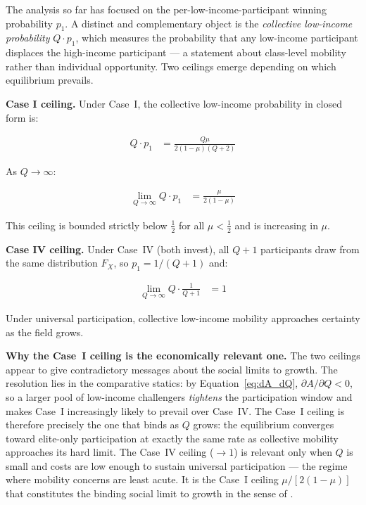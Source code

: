 \documentclass[
    oneside,
    fontsize=10pt,leqno]{article}
\begin{document}
The analysis so far has focused on the per-low-income-participant winning
probability $p_{1}$. A distinct and complementary object is the
\emph{collective low-income probability} $Q\cdot p_{1}$, which measures
the probability that any low-income participant displaces the high-income participant --- a
statement about class-level mobility rather than individual opportunity.
Two ceilings emerge depending on which equilibrium prevails.

\medskip
\noindent\textbf{Case I ceiling.} Under Case~I, the collective low-income
probability in closed form is:

\begin{align}
Q\cdot p_{1} & =\frac{Q\mu}{2(1-\mu)(Q+2)}\label{eq:collective}
\end{align}

As $Q\to\infty$:

\begin{align}
\lim_{Q\to\infty}Q\cdot p_{1} & =\frac{\mu}{2(1-\mu)}\label{eq:ceiling}
\end{align}

This ceiling is bounded strictly below $\tfrac{1}{2}$ for all
$\mu<\tfrac{1}{2}$ and is increasing in $\mu$.

\medskip
\noindent\textbf{Case IV ceiling.} Under Case~IV (both invest),
all $Q+1$ participants draw from the same distribution $F_{X}$, so
$p_{1}=1/(Q+1)$ and:

\begin{align}
\lim_{Q\to\infty}Q\cdot\frac{1}{Q+1} & =1\label{eq:ceiling_IV}
\end{align}

Under universal participation, collective low-income mobility approaches
certainty as the field grows.

\medskip
\noindent\textbf{Why the Case~I ceiling is the economically relevant
one.} The two ceilings appear to give contradictory messages about
the social limits to growth. The resolution lies in the comparative
statics: by Equation~\ref{eq:dA_dQ}, $\partial A/\partial Q<0$, so
a larger pool of low-income challengers \emph{tightens} the participation
window and makes Case~I increasingly likely to prevail over Case~IV.
The Case~I ceiling is therefore precisely the one that binds as $Q$
grows: the equilibrium converges toward elite-only participation at
exactly the same rate as collective mobility approaches its hard
limit. The Case~IV ceiling ($\to1$) is relevant only when $Q$ is
small and costs are low enough to sustain universal participation ---
the regime where mobility concerns are least acute. It is the Case~I
ceiling $\mu/[2(1-\mu)]$ that constitutes the binding social limit
to growth in the sense of \citet{HirschSocialLimits}.
\end{document}
